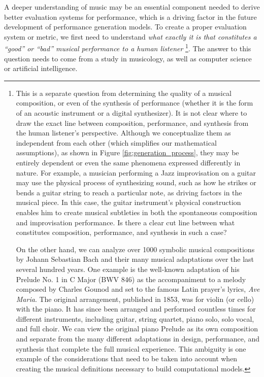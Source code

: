 A deeper understanding of music may be an essential component needed to derive better evaluation systems for performance, which is a driving factor in the future development of performance generation models. To create a proper evaluation system or metric, we first need to understand \emph{what exactly it is that constitutes a ``good'' or ``bad'' musical performance to a human listener}%
\footnote{This is a separate question from determining the quality of a musical composition, or even of the synthesis of performance (whether it is the form of an acoustic instrument or a digital synthesizer). It is not clear where to draw the exact line between composition, performance, and synthesis from the human listener's perspective. Although we conceptualize them as independent from each other (which simplifies our mathematical assumptions), as shown in Figure \ref{fig:generation_process}, they may be entirely dependent or even the same phenomena expressed differently in nature. For example, a musician performing a Jazz improvisation on a guitar may use the physical process of synthesizing sound, such as how he strikes or bends a guitar string to reach a particular note, as driving factors in the musical piece. In this case, the guitar instrument's physical construction enables him to create musical subtleties in both the spontaneous composition and improvisation performance. Is there a clear cut line between what constitutes composition, performance, and synthesis in such a case?

On the other hand, we can analyze over 1000 symbolic musical compositions by Johann Sebastian Bach and their many musical adaptations over the last several hundred years. One example is the well-known adaptation of his Prelude No. 1 in C Major (BWV 846) as the accompaniment to a melody composed by Charles Gounod and set to the famous Latin prayer's lyrics, \emph{Ave Maria}. The original arrangement, published in 1853, was for violin (or cello) with the piano. It has since been arranged and performed countless times for different instruments, including guitar, string quartet, piano solo, solo vocal, and full choir. We can view the original piano Prelude as its own composition and separate from the many different adaptations in design, performance, and synthesis that complete the full musical experience. This ambiguity is one example of the considerations that need to be taken into account when creating the musical definitions necessary to build computational models.}. The answer to this question needs to come from a study in musicology, as well as computer science or artificial intelligence. 

